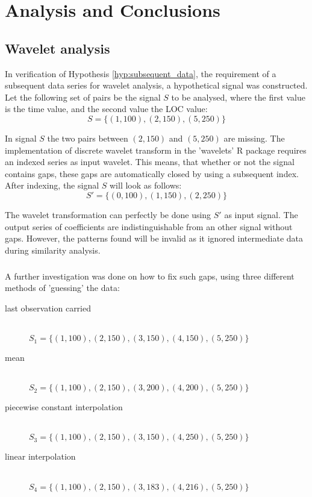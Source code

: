 \chapter{Analysis and Conclusions}
\label{analysis}

\section{Wavelet analysis}
In verification of Hypothesis \ref{hyp:subsequent_data}, the requirement of a
subsequent data series for wavelet analysis, a hypothetical signal was
constructed. Let the following set of pairs be the signal $S$ to be analysed,
where the first value is the time value, and the second value the LOC value:
$$S = \{(1,100), (2,150), (5,250)\}$$

\noindent
In signal $S$ the two pairs between $(2,150)$ and $(5,250)$ are missing. The
implementation of discrete wavelet transform in the 'wavelets' R package
requires an indexed series as input wavelet. This means, that whether or not
the signal contains gaps, these gaps are automatically closed by using a
subsequent index. After indexing, the signal $S$ will look as follows:
$$S' = \{(0,100), (1,150), (2,250)\}$$

\noindent
The wavelet transformation can perfectly be done using $S'$ as input
signal. The output series of coefficients are indistinguishable from an other
signal without gaps. However, the patterns found will be invalid as it ignored
intermediate data during similarity analysis.

\paragraph{}
A further investigation was done on how to fix such gaps, using three different
methods of 'guessing' the data:
\begin{description}
	\item[last observation carried] \hfill \\[1em]
	$S_{1} = \{(1,100), (2,150), (3,150), (4,150), (5,250)\}$

	\item[mean] \hfill \\[1em]
	$S_{2} = \{(1,100), (2,150), (3,200), (4,200), (5,250)\}$
	
	\item[piecewise constant interpolation] \hfill \\[1em]
	$S_{3} = \{(1,100), (2,150), (3,150), (4,250), (5,250)\}$
	
	\item[linear interpolation] \hfill \\[1em]
	$S_{4} = \{(1,100), (2,150), (3,183), (4,216), (5,250)\}$
\end{description}

